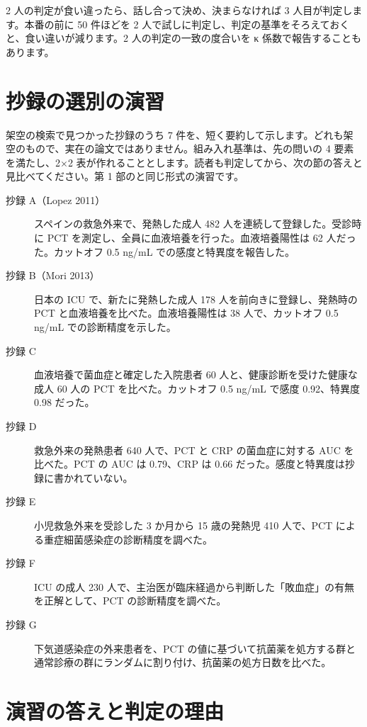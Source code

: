 2 人の判定が食い違ったら、話し合って決め、決まらなければ 3 人目が判定します。本番の前に 50 件ほどを 2 人で試しに判定し、判定の基準をそろえておくと、食い違いが減ります。2 人の判定の一致の度合いを κ 係数で報告することもあります。

\section{抄録の選別の演習}
\label{sec:11-4}

架空の検索で見つかった抄録のうち 7 件を、短く要約して示します。どれも架空のもので、実在の論文ではありません。組み入れ基準は、先の問いの 4 要素を満たし、2×2 表が作れることとします。読者も判定してから、次の節の答えと見比べてください。第 1 部のと同じ形式の演習です。

\begin{description}
\item[抄録 A（Lopez 2011）] スペインの救急外来で、発熱した成人 482 人を連続して登録した。受診時に PCT を測定し、全員に血液培養を行った。血液培養陽性は 62 人だった。カットオフ 0.5 ng/mL での感度と特異度を報告した。
\item[抄録 B（Mori 2013）] 日本の ICU で、新たに発熱した成人 178 人を前向きに登録し、発熱時の PCT と血液培養を比べた。血液培養陽性は 38 人で、カットオフ 0.5 ng/mL での診断精度を示した。
\item[抄録 C] 血液培養で菌血症と確定した入院患者 60 人と、健康診断を受けた健康な成人 60 人の PCT を比べた。カットオフ 0.5 ng/mL で感度 0.92、特異度 0.98 だった。
\item[抄録 D] 救急外来の発熱患者 640 人で、PCT と CRP の菌血症に対する AUC を比べた。PCT の AUC は 0.79、CRP は 0.66 だった。感度と特異度は抄録に書かれていない。
\item[抄録 E] 小児救急外来を受診した 3 か月から 15 歳の発熱児 410 人で、PCT による重症細菌感染症の診断精度を調べた。
\item[抄録 F] ICU の成人 230 人で、主治医が臨床経過から判断した「敗血症」の有無を正解として、PCT の診断精度を調べた。
\item[抄録 G] 下気道感染症の外来患者を、PCT の値に基づいて抗菌薬を処方する群と通常診療の群にランダムに割り付け、抗菌薬の処方日数を比べた。
\end{description}

\section{演習の答えと判定の理由}
\label{sec:11-5}


